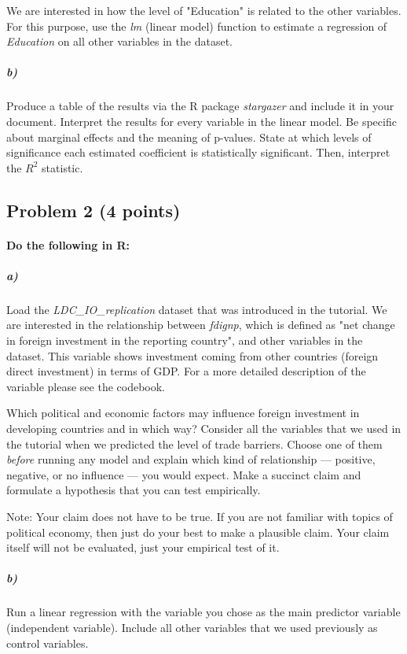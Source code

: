 \documentclass[12pt]{article}
\begin{document}
We are interested in how the level of "Education" is related to the other variables. For this purpose, use the \textit{lm} (linear model) function to estimate a regression of \textit{Education} on all other variables in the dataset.

\subparagraph{b)} Produce a table of the results via the R package \textit{stargazer} and include it in your document. Interpret the results for every variable in the linear model. Be specific about marginal effects and the meaning of p-values. State at which levels of significance each estimated coefficient is statistically significant. Then, interpret the $R^2$ statistic.



\subsection*{Problem 2 (4 points)}

\paragraph{Do the following in R:}

\subparagraph{a)} Load the \textit{LDC\_IO\_replication} dataset that was introduced in the tutorial. We are interested in the relationship between \textit{fdignp}, which is defined as "net change in foreign investment in the reporting country", and other variables in the dataset. This variable shows investment coming from other countries (foreign direct investment) in terms of GDP. For a more detailed description of the variable please see the codebook.

Which political and economic factors may influence foreign investment in developing countries and in which way? Consider all the variables that we used in the tutorial when we predicted the level of trade barriers. Choose one of them \textit{before} running any model and explain which kind of relationship --- positive, negative, or no influence --- you would expect. Make a succinct claim and formulate a hypothesis that you can test empirically.

Note: Your claim does not have to be true. If you are not familiar with topics of political economy, then just do your best to make a plausible claim. Your claim itself will not be evaluated, just your empirical test of it.

\subparagraph{b)} Run a linear regression with the variable you chose as the main predictor variable (independent variable). Include all other variables that we used previously as control variables.
\end{document}
